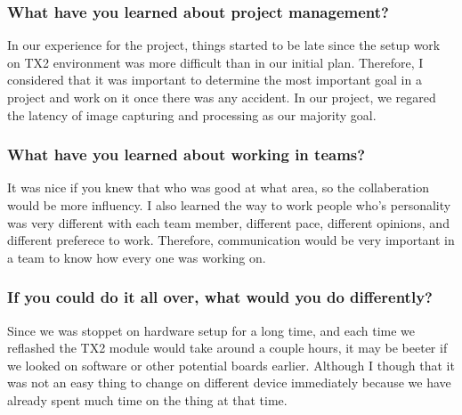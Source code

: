 \subsubsection{What have you learned about project management?}
In our experience for the project, things started to be late since the setup work on TX2 environment was 
more difficult than in our initial plan. Therefore, I considered that it was important to determine the 
most important goal in a project and work on it once there was any accident. In our project, we regared 
the latency of image capturing and processing as our majority goal. \\

\subsubsection{What have you learned about working in teams?}
It was nice if you knew that who was good at what area, so the collaberation would be more influency. 
I also learned the way to work people who's personality was very different with each team member, different 
pace, different opinions, and different preferece to work. Therefore, communication would be very important 
in a team to know how every one was working on. \\

\subsubsection{If you could do it all over, what would you do differently?}
Since we was stoppet on hardware setup for a long time, and each time we reflashed the TX2 module would 
take around a couple hours, it may be beeter if we looked on software or other potential boards earlier. 
Although I though that it was not an easy thing to change on different device immediately because we have 
already spent much time on the thing at that time. \\